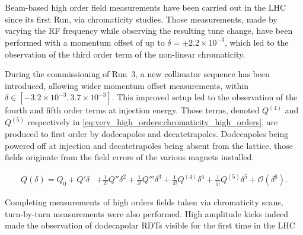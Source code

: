 \chapter{}
\thumbforchapter{}

\section{}

Beam-based high order field measurements have been carried out in the LHC since its first
Run, via chromaticity studies.
Those measurements, made by varying the RF frequency while observing the resulting tune change, have
been performed with a momentum offset of up to $\delta = \pm 2.2 \times 10^{-3}$, which led to the
observation of the third order term of the non-linear chromaticity.

During the commissioning of Run~3, a new collimator sequence has been introduced, allowing wider
momentum offset measurements, within $\delta \in [-3.2\times 10^{-3},3.7 \times 10^{-3}]$. This
improved setup led to the observation of the fourth and fifth order terms at injection energy.
Those terms, denoted $Q^{(4)}$ and $Q^{(5)}$ respectively in
\cref{eq:very_high_orders:chromaticity_high_orders}, are produced to first order by dodecapoles and
decatetrapoles. Dodecapoles being powered off at injection and decatetrapoles being absent from the
lattice, those fields originate from the field errors of the various magnets installed.

\begin{equation}
\begin{aligned}
Q(\delta) = Q_0 + Q'\delta &+ \frac{1}{2!}Q''\delta^2 + \frac{1}{3!}Q'''\delta^3
                            + \frac{1}{4!}Q^{(4)}\delta^4  + \frac{1}{5!}Q^{(5)}\delta^5
                            + \mathcal{O}(\delta^6).
\end{aligned}
    \label{eq:very_high_orders:chromaticity_high_orders}
\end{equation}

Completing measurements of high orders fields taken via chromaticity scans, turn-by-turn
measurements were also performed. High amplitude kicks indeed made the observation of dodecapolar
RDTs visible for the first time in the LHC




